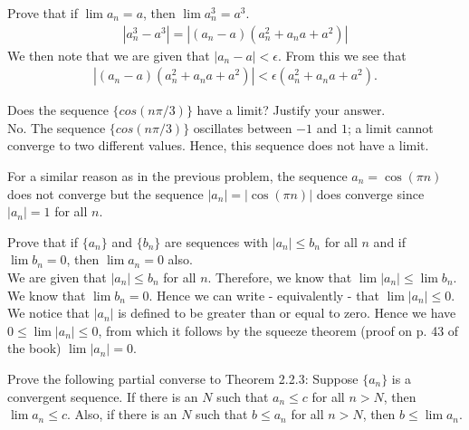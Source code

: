 \documentclass[12pt]{book}
\newenvironment{exercise}[2][Exercise]{\begin{trivlist}
\item[\hskip \labelsep {\bfseries #1}\hskip \labelsep {\bfseries #2.}]}{\end{trivlist}}
\begin{document}
\begin{exercise}{1.4.6}
\begin{exercise}{2.2.8}
Prove that if $\lim a_n = a$, then $\lim a_n^3 = a^3$. 
	\begin{align*}
	|a_n^3 - a^3 | = |(a_n - a) (a_n^2 + a_n a + a^2)|
	\end{align*}
We then note that we are given that $|a_n - a| < \epsilon$. From this we see that 
	\begin{align*}
	|(a_n - a) (a_n^2 + a_n a + a^2)| < \epsilon (a_n^2 + a_n a + a^2).
	\end{align*}
\end{exercise}


\begin{exercise}{2.2.9}
Does the sequence $\{cos(n \pi /3)\}$ have a limit? Justify your answer. \\

No. The sequence $\{cos(n \pi /3)\}$ oscillates between $-1$ and $1$; a limit cannot converge to two different values. Hence, this sequence does not have a limit.
\end{exercise}

\begin{exercise}{2.2.10}
For a similar reason as in the previous problem, the sequence $a_n = \cos (\pi n)$ does not converge but the sequence $|a_n| = |\cos (\pi n)|$ does converge since $|a_n| = 1$ for all $n$. 
\end{exercise}

\begin{exercise}{2.2.11}
Prove that if $\{a_n\}$ and $\{b_n\}$ are sequences with $|a_n| \leq b_n$ for all $n$ and if $\lim b_n =0$, then $\lim a_n = 0$ also. \\

We are given that $ |a_n|  \leq b_n$ for all $n$. Therefore, we know that $ \lim |a_n| \leq \lim b_n$. We know that $\lim b_n = 0$. Hence we can write - equivalently - that $\lim |a_n| \leq 0$. We notice that $|a_n|$ is defined to be greater than or equal to zero. Hence we have $0 \leq \lim |a_n| \leq 0$, from which it follows by the squeeze theorem (proof on p. 43 of the book) $\lim |a_n| = 0$.
\end{exercise}


\begin{exercise}{2.2.12}
Prove the following partial converse to Theorem 2.2.3: Suppose $\{a_n\}$ is a convergent sequence. If there is an $N$ such that $a_n \leq c$ for all $n > N$, then $\lim a_n \leq c$. Also, if there is an $N$ such that $b \leq a_n$ for all $n > N$, then $b \leq \lim a_n$. \\


\end{exercise}
\end{exercise}
\end{document}
